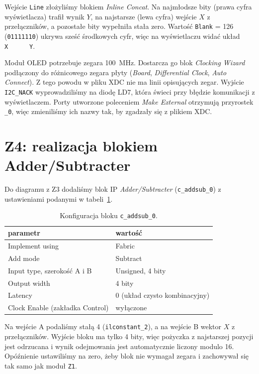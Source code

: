 \documentclass[11pt,a4paper]{article}
\begin{document}
Wejście \texttt{Line} złożyliśmy blokiem \emph{Inline Concat}. Na najmłodsze bity (prawa cyfra wyświetlacza) trafił wynik $Y$, na najstarsze (lewa cyfra) wejście $X$ z przełączników, a pozostałe bity wypełniła stała zero. Wartość \texttt{Blank} = 126 (\texttt{01111110}) ukrywa sześć środkowych cyfr, więc na wyświetlaczu widać układ \texttt{X~~~~~~Y}.

Moduł OLED potrzebuje zegara 100~MHz. Dostarcza go blok \emph{Clocking Wizard} podłączony do różnicowego zegara płyty (\emph{Board}, \emph{Differential Clock}, \emph{Auto Connect}). Z tego powodu w pliku XDC nie ma linii opisujących zegar. Wyjście \texttt{I2C\_NACK} wyprowadziliśmy na diodę LD7, która świeci przy błędzie komunikacji z wyświetlaczem. Porty utworzone poleceniem \emph{Make External} otrzymują przyrostek \texttt{\_0}, więc zmieniliśmy ich nazwy tak, by zgadzały się z plikiem XDC.



\section{Z4: realizacja blokiem Adder/Subtracter}

Do diagramu z Z3 dodaliśmy blok IP \emph{Adder/Subtracter} (\texttt{c\_addsub\_0}) z ustawieniami podanymi w tabeli~\ref{tab:addsub}.

\begin{table}[H]
\centering
\small
\begin{tabular}{ll}
\toprule
parametr & wartość\\
\midrule
Implement using & Fabric\\
Add mode & Subtract\\
Input type, szerokość A i B & Unsigned, 4 bity\\
Output width & 4 bity\\
Latency & 0 (układ czysto kombinacyjny)\\
Clock Enable (zakładka Control) & wyłączone\\
\bottomrule
\end{tabular}
\caption{Konfiguracja bloku \texttt{c\_addsub\_0}.}
\label{tab:addsub}
\end{table}

Na wejście A podaliśmy stałą 4 (\texttt{ilconstant\_2}), a na wejście B wektor $X$ z przełączników. Wyjście bloku ma tylko 4 bity, więc pożyczka z najstarszej pozycji jest odrzucana i wynik odejmowania jest automatycznie liczony modulo 16. Opóźnienie ustawiliśmy na zero, żeby blok nie wymagał zegara i zachowywał się tak samo jak moduł \texttt{Z1}.
\end{document}
